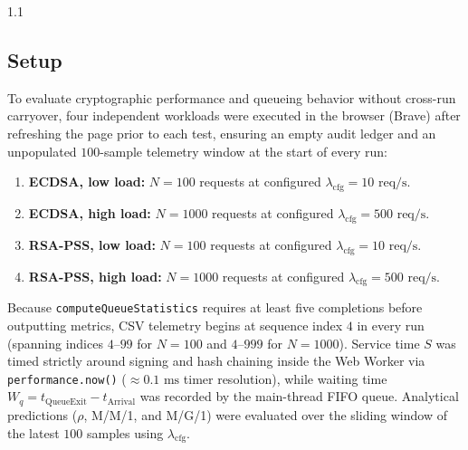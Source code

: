 \documentclass[11pt,a4paper]{article}
\begin{document}
\begin{spacing}{1.1}
\subsection{Setup}
To evaluate cryptographic performance and queueing behavior without cross-run carryover, four independent workloads were executed in the browser (Brave) after refreshing the page prior to each test, ensuring an empty audit ledger and an unpopulated $100$-sample telemetry window at the start of every run:
\begin{enumerate}
    \item \textbf{ECDSA, low load:} $N = 100$ requests at configured $\lambda_{\text{cfg}} = 10\text{ req/s}$.
    \item \textbf{ECDSA, high load:} $N = 1000$ requests at configured $\lambda_{\text{cfg}} = 500\text{ req/s}$.
    \item \textbf{RSA-PSS, low load:} $N = 100$ requests at configured $\lambda_{\text{cfg}} = 10\text{ req/s}$.
    \item \textbf{RSA-PSS, high load:} $N = 1000$ requests at configured $\lambda_{\text{cfg}} = 500\text{ req/s}$.
\end{enumerate}

\vspace{1em}\noindent Because \texttt{computeQueueStatistics} requires at least five completions before outputting metrics, CSV telemetry begins at sequence index $4$ in every run (spanning indices $4\text{--}99$ for $N=100$ and $4\text{--}999$ for $N=1000$). Service time $S$ was timed strictly around signing and hash chaining inside the Web Worker via \texttt{performance.now()} ($\approx 0.1\text{ ms}$ timer resolution), while waiting time $W_q = t_{\text{QueueExit}} - t_{\text{Arrival}}$ was recorded by the main-thread FIFO queue. Analytical predictions ($\rho$, M/M/1, and M/G/1) were evaluated over the sliding window of the latest $100$ samples using $\lambda_{\text{cfg}}$.


\end{spacing}
\end{document}
